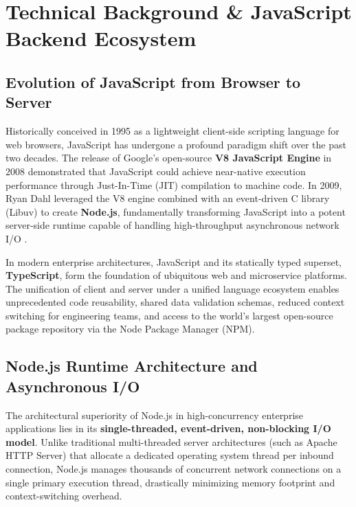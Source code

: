 \chapter{Technical Background \& JavaScript Backend Ecosystem}
\label{ch:technical_foundations}

\section{Evolution of JavaScript from Browser to Server}
\label{sec:tech_js_evolution}

Historically conceived in 1995 as a lightweight client-side scripting language for web browsers, JavaScript has undergone a profound paradigm shift over the past two decades. The release of Google's open-source \textbf{V8 JavaScript Engine} in 2008 demonstrated that JavaScript could achieve near-native execution performance through Just-In-Time (JIT) compilation to machine code. In 2009, Ryan Dahl leveraged the V8 engine combined with an event-driven C library (Libuv) to create \textbf{Node.js}, fundamentally transforming JavaScript into a potent server-side runtime capable of handling high-throughput asynchronous network I/O \citep{tilkov2010node}.

In modern enterprise architectures, JavaScript and its statically typed superset, \textbf{TypeScript}, form the foundation of ubiquitous web and microservice platforms. The unification of client and server under a unified language ecosystem enables unprecedented code reusability, shared data validation schemas, reduced context switching for engineering teams, and access to the world's largest open-source package repository via the Node Package Manager (NPM).

\section{Node.js Runtime Architecture and Asynchronous I/O}
\label{sec:tech_nodejs_arch}

The architectural superiority of Node.js in high-concurrency enterprise applications lies in its \textbf{single-threaded, event-driven, non-blocking I/O model}. Unlike traditional multi-threaded server architectures (such as Apache HTTP Server) that allocate a dedicated operating system thread per inbound connection, Node.js manages thousands of concurrent network connections on a single primary execution thread, drastically minimizing memory footprint and context-switching overhead.

